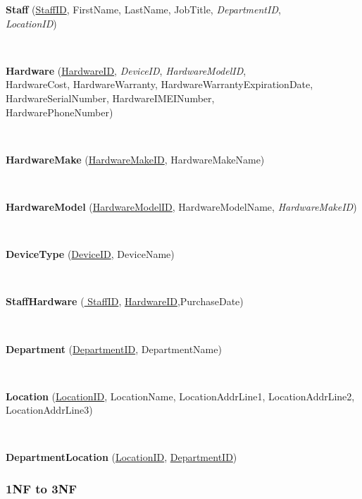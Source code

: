 \textbf{Staff}  (\underline{StaffID}, FirstName, LastName, JobTitle, \textit{DepartmentID},\\ \textit{ LocationID})


\

\textbf{Hardware}  (\underline{HardwareID}, \textit{DeviceID},  \textit{HardwareModelID},\\ HardwareCost, HardwareWarranty, HardwareWarrantyExpirationDate,\\ HardwareSerialNumber, 		HardwareIMEINumber, \\HardwarePhoneNumber)

\

\textbf{HardwareMake} (\underline{HardwareMakeID}, HardwareMakeName)

\

\textbf{HardwareModel} (\underline{HardwareModelID}, HardwareModelName, \textit{HardwareMakeID})

\


\textbf{DeviceType}  (\underline{DeviceID}, DeviceName)


\


\textbf{StaffHardware}  (\underline{ StaffID}, \underline{ HardwareID},PurchaseDate)


\


\textbf{Department}  (\underline{DepartmentID}, DepartmentName)


\


\textbf{Location}  (\underline{LocationID}, LocationName, LocationAddrLine1, LocationAddrLine2, LocationAddrLine3)

\

\textbf{DepartmentLocation} (\underline{LocationID}, \underline{DepartmentID})




\subsubsection{1NF to 3NF}

